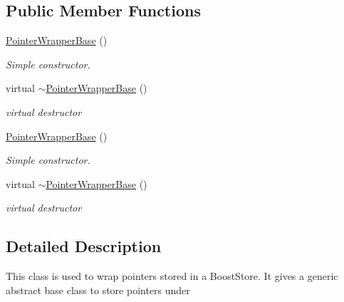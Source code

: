 \subsection*{Public Member Functions}
\begin{DoxyCompactItemize}
\item 
\hypertarget{classPointerWrapperBase_ac9e248557a8aa248bcbbadc469c77f52}{\hyperlink{classPointerWrapperBase_ac9e248557a8aa248bcbbadc469c77f52}{Pointer\-Wrapper\-Base} ()}\label{classPointerWrapperBase_ac9e248557a8aa248bcbbadc469c77f52}

\begin{DoxyCompactList}\small\item\em Simple constructor. \end{DoxyCompactList}\item 
\hypertarget{classPointerWrapperBase_a842fb0af38187d71678971452c1e1094}{virtual \hyperlink{classPointerWrapperBase_a842fb0af38187d71678971452c1e1094}{$\sim$\-Pointer\-Wrapper\-Base} ()}\label{classPointerWrapperBase_a842fb0af38187d71678971452c1e1094}

\begin{DoxyCompactList}\small\item\em virtual destructor \end{DoxyCompactList}\item 
\hypertarget{classPointerWrapperBase_ac9e248557a8aa248bcbbadc469c77f52}{\hyperlink{classPointerWrapperBase_ac9e248557a8aa248bcbbadc469c77f52}{Pointer\-Wrapper\-Base} ()}\label{classPointerWrapperBase_ac9e248557a8aa248bcbbadc469c77f52}

\begin{DoxyCompactList}\small\item\em Simple constructor. \end{DoxyCompactList}\item 
\hypertarget{classPointerWrapperBase_a842fb0af38187d71678971452c1e1094}{virtual \hyperlink{classPointerWrapperBase_a842fb0af38187d71678971452c1e1094}{$\sim$\-Pointer\-Wrapper\-Base} ()}\label{classPointerWrapperBase_a842fb0af38187d71678971452c1e1094}

\begin{DoxyCompactList}\small\item\em virtual destructor \end{DoxyCompactList}\end{DoxyCompactItemize}


\subsection{Detailed Description}
This class is used to wrap pointers stored in a Boost\-Store. It gives a generic abstract base class to store pointers under

